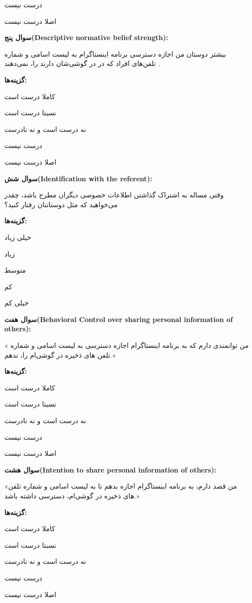 درست نیست

اصلا درست نیست



\textbf{سوال پنج(\gls{Descriptive normative belief strength}):}

بیشتر دوستان من اجازه دسترسی برنامه اینستاگرام به لیست اسامی و شماره تلفن‌‌های افراد که در در گوشی‌شان دارند را، نمی‌دهند . 

\textbf{گزینه‌ها:}

کاملا درست است

نسبتا درست است

نه درست است و نه نادرست

درست نیست

اصلا درست نیست

\textbf{سوال شش(\gls{Identification with the referent}):}

وقتی مساله به اشتراک گذاشتن اطلاعات خصوصی دیگران مطرح باشد، چقدر می‌خواهید که
مثل دوستانتان رفتار کنید؟ 

\textbf{گزینه‌ها:}

خیلی زیاد

زیاد

متوسط

کم

خیلی کم



\textbf{سوال هفت(\gls{Behavioral Control over sharing personal information of others}):}

« من توانمندی دارم که به برنامه اینستاگرام اجازه دسترسی به لیست اسامی و شماره تلفن های ذخیره در گوشی‌ام را، ندهم.» 

\textbf{گزینه‌ها:}

کاملا درست است

نسبتا درست است

نه درست است و نه نادرست

درست نیست

اصلا درست نیست



\textbf{سوال هشت(\gls{Intention to share personal information of others}):}

«من قصد دارم، به برنامه اینستاگرام اجازه بدهم تا به لیست اسامی و شماره تلفن های ذخیره در گوشی‌ام، دسترسی داشته باشد.» 

\textbf{گزینه‌ها:}


کاملا درست است

نسبتا درست است

نه درست است و نه نادرست

درست نیست

اصلا درست نیست


